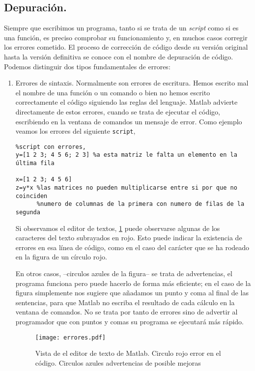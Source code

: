 \subsection{Depuración.}
Siempre que escribimos un programa, tanto si se trata de un \emph{script} como si es una función, es preciso comprobar su funcionamiento y, en  muchos casos corregir los errores cometido. El proceso de corrección de código desde su versión original hasta la versión definitiva se conoce con el nombre de depuración de código. Podemos distinguir dos tipos fundamentales de errores:

\begin{enumerate} 
\item Errores de sintaxis. Normalmente son errores de escritura. Hemos escrito mal el nombre de una función o un comando o bien no hemos escrito correctamente el código siguiendo las reglas del lenguaje. Matlab advierte directamente de estos errores, cuando se trata de ejecutar el código, escribiendo en la ventana de comandos un mensaje de error. Como ejemplo veamos los errores del siguiente \texttt{script},

\begin{verbatim}
%script con errores,
y=[1 2 3; 4 5 6; 2 3] %a esta matriz le falta un elemento en la última fila

x=[1 2 3; 4 5 6]
z=y*x %las matrices no pueden multiplicarse entre si por que no coinciden
      %numero de columnas de la primera con numero de filas de la segunda
\end{verbatim}

Si observamos el editor de textos, \ref{fig:ederror} puede observarse algunas de los caracteres del texto subrayados en rojo. Esto puede indicar la existencia de errores en esa línea de código, como en el caso del carácter que se ha rodeado en la figura de un círculo rojo. 

En otros casos, --circulos azules de la figura-- se trata de advertencias, el programa funciona pero puede hacerlo de forma más eficiente; en el caso de la figura simplemente nos sugiere que añadamos un punto y coma al final de las sentencias, para que Matlab no escriba el resultado de cada cálculo en la ventana de comandos. No se trata por tanto de errores sino de advertir al programador que con puntos y comas su programa se ejecutará más rápido.

\begin{figure}[h]
\centering
\texttt{[image: errores.pdf]}
\caption{Vista de el editor de texto de Matlab. Circulo rojo error en el código. Circulos azules advertencias de posible mejoras}
\label{fig:ederror}
\end{figure}


\end{enumerate}
